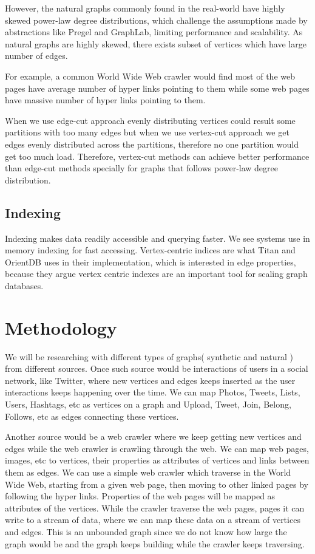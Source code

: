 \documentclass[12pt]{article}
\begin{document}
However, the natural graphs commonly found in the real-world have highly skewed power-law degree distributions, which challenge the assumptions made by abstractions like  Pregel and GraphLab, limiting performance and scalability. As natural graphs are highly skewed, there exists subset of vertices which have large number of edges. 

For example, a common World Wide Web crawler would find most of the web pages have average number of hyper links pointing to them while some web pages have massive number of hyper links pointing to them. 

When we use edge-cut approach evenly distributing vertices could result some partitions with too many edges but when we use vertex-cut approach we get edges evenly distributed across the partitions, therefore no one partition would get too much load. Therefore, vertex-cut methods can achieve better performance than edge-cut methods\cite{PowerGraph} specially for graphs that follows power-law degree distribution.

\subsection{Indexing}
Indexing makes data readily accessible and querying faster. We see systems use in memory indexing for fast accessing. Vertex-centric indices are what Titan and OrientDB uses in their implementation, which is interested in edge properties, because they argue vertex centric indexes are an important tool for scaling graph databases.

\section{Methodology}

We will be researching with different types of graphs( synthetic and natural ) from different sources. Once such source would be interactions of users in a social network, like Twitter, where new vertices and edges keeps inserted as the user interactions keeps happening over the time. We can map Photos, Tweets, Lists, Users, Hashtags, etc as vertices on a graph and Upload, Tweet, Join, Belong, Follows, etc as edges connecting these vertices.

Another source would be a web crawler where we keep getting new vertices and edges while the web crawler is crawling through the web. We can map web pages, images, etc to vertices, their properties as attributes of vertices and links between them as edges. We can use a simple web crawler which traverse in the World Wide Web, starting from a given web page, then moving to other linked pages by following the hyper links. Properties of the web pages will be mapped as attributes of the vertices. While the crawler traverse the web pages, pages it can write to a stream of data, where we can map these data on a stream of vertices and edges. This is an unbounded graph since we do not know how large the graph would be and the graph keeps building while the crawler keeps traversing.
\end{document}
